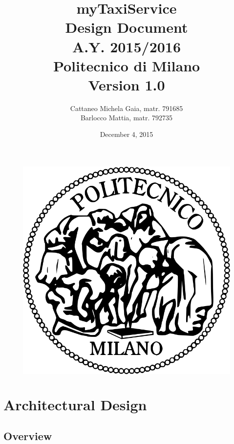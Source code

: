 \documentclass[18pt,oneside,a4paper, titlepage]{article}
\begin{document}
\begin{figure}[t]
	\centering
	\includegraphics[scale=0.35]{logo-polimi.png}
\end{figure}
\title{\textbf{myTaxiService}\\\textbf{D}esign \textbf{D}ocument\\ A.Y. 2015/2016\\
	Politecnico di Milano \\ Version 1.0}	
\author{Cattaneo Michela Gaia, matr. 791685\\Barlocco Mattia, matr. 792735 }
\date{December 4, 2015}
\maketitle

\newpage
	\tableofcontents

\newpage
	\section{Architectural Design}
		\subsection{Overview}
\end{document}
